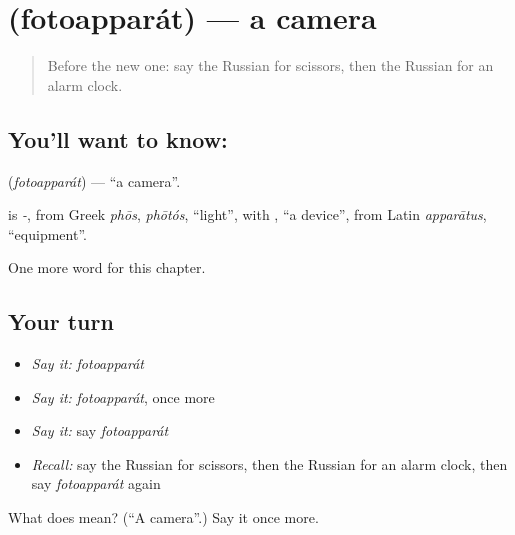 \section[\texorpdfstring{\ru{фотоаппарат} (fotoapparát)}{фотоаппарат (fotoapparát)}]{ (fotoapparát) — a camera}

\label{lesson:RU-C99-camera}



\begin{quote}
Before the new one: say the Russian for scissors, then the Russian for an alarm clock.
\end{quote}

\subsection*{You'll want to know: }
\textbf{} (\emph{fotoapparát}) — \textquotedblleft{}a camera\textquotedblright{}.

\begin{cousinweb}
\textbf{} is \emph{-}, from Greek \emph{phōs}, \emph{phōtós}, \textquotedblleft{}light\textquotedblright{}, with \emph{}, \textquotedblleft{}a device\textquotedblright{}, from Latin \emph{apparātus}, \textquotedblleft{}equipment\textquotedblright{}.
\end{cousinweb}

\begin{grammarlens}[title={What you've built}]
One more word for this chapter.
\end{grammarlens}

\subsection*{Your turn}
\begin{itemize}
\raggedright
  \item \emph{Say it:} \emph{fotoapparát}
  \item \emph{Say it:} \emph{fotoapparát}, once more
  \item \emph{Say it:} say \emph{fotoapparát}
  \item \emph{Recall:} say the Russian for scissors, then the Russian for an alarm clock, then say \emph{fotoapparát} again
\end{itemize}

\begin{tcolorbox}[breakable,colback=teal!4,colframe=teal!35!black,title={Before you move on}]
What does  mean? (\textquotedblleft{}A camera\textquotedblright{}.) Say it once more.
\end{tcolorbox}
